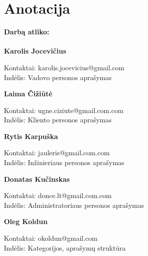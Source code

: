 

\newcommand{\anotacijaIndelis}[3]{
	\textbf{#1}
	\begin{flushleft}
	\hspace*{1cm}
	Kontaktai: #2
	\\
	\hspace*{1cm}
	Indėlis: #3
	\end{flushleft}
}

\newcommand{\anotacija}[2]{
	\textbf{#1}
	\begin{flushleft}
	\hspace*{1cm}
	Kontaktai: #2
	\end{flushleft}
}

\section*{Anotacija}
	
		\textbf{Darbą atliko:}\\\\
		
		\anotacijaIndelis{Karolis Jocevičius}{karolis.jocevicius@gmail.com}{Vadovo personos aprašymas}
		
		\anotacijaIndelis{Laima Čižiūtė}{ugne.ciziute@gmail.com.com}{Kliento personos aprašymas}
		
		\anotacijaIndelis{Rytis Karpuška}{jauleris@gmail.com.com}{Inžinieriaus personos aprašymas}

		\anotacijaIndelis{Donatas Kučinskas}{donce.lt@gmail.com.com}{Administratoriaus personos aprašymas}

		\anotacijaIndelis{Oleg Koldun}{okoldun@gmail.com}{Kategorijos, aprašymų struktūra}